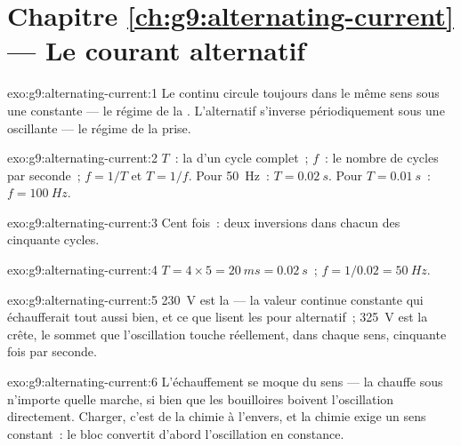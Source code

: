 \section*{Chapitre \ref{ch:g9:alternating-current} --- Le courant alternatif}

\begin{solution}{exo:g9:alternating-current:1}
Le continu circule toujours dans le même sens sous une 
constante --- le régime de la . L'alternatif s'inverse
périodiquement sous une  oscillante --- le régime de la prise.
\end{solution}

\begin{solution}{exo:g9:alternating-current:2}
$T$~: la  d'un cycle complet~; $f$~: le nombre de cycles par
seconde~; $f = 1/T$ et $T = 1/f$. Pour \qty{50}{Hz}~:
$T = \qty{0.02}{s}$. Pour $T = \qty{0.01}{s}$~: $f = \qty{100}{Hz}$.
\end{solution}

\begin{solution}{exo:g9:alternating-current:3}
Cent fois~: deux inversions dans chacun des cinquante cycles.
\end{solution}

\begin{solution}{exo:g9:alternating-current:4}
$T = 4 \times 5 = \qty{20}{ms} = \qty{0.02}{s}$~;
$f = 1/0.02 = \qty{50}{Hz}$.
\end{solution}

\begin{solution}{exo:g9:alternating-current:5}
\qty{230}{V} est la  --- la valeur continue constante
qui échaufferait tout aussi bien, et ce que lisent les  pour
alternatif~; \qty{325}{V} est la crête, le sommet que l'oscillation
touche réellement, dans chaque sens, cinquante fois par seconde.
\end{solution}

\begin{solution}{exo:g9:alternating-current:6}
L'échauffement se moque du sens --- la  chauffe sous
n'importe quelle marche, si bien que les bouilloires boivent
l'oscillation directement. Charger, c'est de la chimie à l'envers, et
la chimie exige un sens constant~: le bloc convertit d'abord
l'oscillation en constance.
\end{solution}

